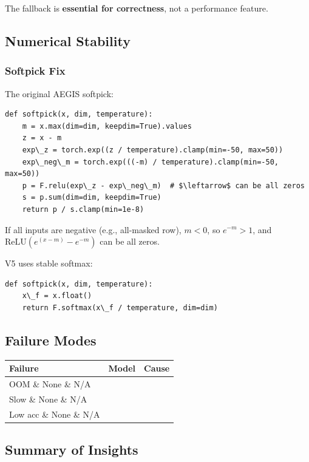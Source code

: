 The fallback is \textbf{essential for correctness}, not a performance feature.

\subsection{Numerical Stability}

\subsubsection{Softpick Fix}

The original AEGIS softpick:

\begin{lstlisting}
def softpick(x, dim, temperature):
    m = x.max(dim=dim, keepdim=True).values
    z = x - m
    exp\_z = torch.exp((z / temperature).clamp(min=-50, max=50))
    exp\_neg\_m = torch.exp(((-m) / temperature).clamp(min=-50, max=50))
    p = F.relu(exp\_z - exp\_neg\_m)  # $\leftarrow$ can be all zeros
    s = p.sum(dim=dim, keepdim=True)
    return p / s.clamp(min=1e-8)
\end{lstlisting}

If all inputs are negative (e.g., all-masked row), $m < 0$, so 
$e^{-m} > 1$, and $\text{ReLU}(e^{(x-m)} - e^{-m})$ can be all zeros.

V5 uses stable softmax:

\begin{lstlisting}
def softpick(x, dim, temperature):
    x\_f = x.float()
    return F.softmax(x\_f / temperature, dim=dim)
\end{lstlisting}

\subsection{Failure Modes}

\begin{table}[H]
\centering
\small
\begin{tabular}{lll}
\toprule
\textbf{Failure} & \textbf{Model} & \textbf{Cause} \\
\midrule
OOM \& None \& N/A \\
Slow \& None \& N/A \\
Low acc \& None \& N/A \\
\bottomrule
\end{tabular}
\end{table}

\subsection{Summary of Insights}

